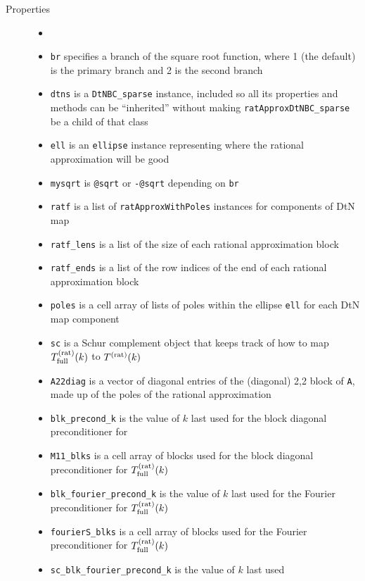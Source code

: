 \begin{description}
 \item[Properties]
   \begin{itemize}
    \item[]
    \item {\tt br} specifies a branch of the square root function, where
          1 (the default) is the primary branch and 2 is the second branch
    \item {\tt dtns} is a {\tt DtNBC\_sparse} instance, included so 
          all its properties and methods can be ``inherited'' without
          making {\tt ratApproxDtNBC\_sparse} be a child of that class 
    \item {\tt ell} is an {\tt ellipse} instance representing where
          the rational approximation will be good
    \item {\tt mysqrt} is {\tt @sqrt} or {\tt -@sqrt} depending on {\tt br}
    \item {\tt ratf} is a list of {\tt ratApproxWithPoles} instances for
          components of DtN map
    \item {\tt ratf\_lens} is a list of the size of each rational approximation
          block
    \item {\tt ratf\_ends} is a list of the row indices of the end of each
          rational approximation block
    \item {\tt poles} is a cell array of lists of poles 
          within the ellipse {\tt ell} for each DtN map component
    \item {\tt sc} is a Schur complement object that keeps track of how to
          map $T^{(\text{rat})}_{\text{full}}(k)$ to $T^{(\text{rat})}(k)$
    \item {\tt A22diag} is a vector of diagonal entries of the
          (diagonal) 2,2 block of {\tt A}, made up of the poles of the
          rational approximation
    \item {\tt blk\_precond\_k} is the value of $k$ last used for the block
          diagonal preconditioner for 
    \item {\tt M11\_blks} is a cell array of blocks used for the block diagonal
          preconditioner for $T^{(\text{rat})}_{\text{full}}(k)$
    \item {\tt blk\_fourier\_precond\_k} is the value of $k$ last used for
          the Fourier preconditioner for $T^{(\text{rat})}_{\text{full}}(k)$
    \item {\tt fourierS\_blks} is a cell array of blocks used for the Fourier
          preconditioner for $T^{(\text{rat})}_{\text{full}}(k)$
    \item {\tt sc\_blk\_fourier\_precond\_k} is the value of $k$ last used

\end{itemize}
\end{description}
